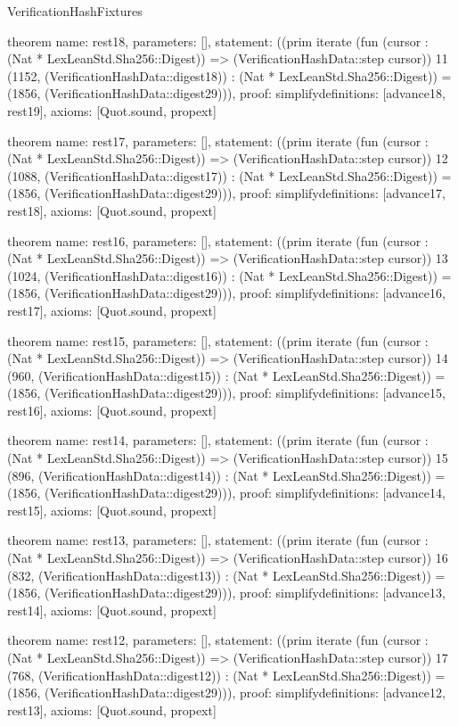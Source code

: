 \begin{lexlean}{VerificationHashFixtures}
\begin{semanticmodule}
theorem{
  name: rest18,
  parameters: [],
  statement: ((prim iterate (fun (cursor : (Nat * LexLeanStd.Sha256::Digest)) => (VerificationHashData::step cursor)) 11 (1152, (VerificationHashData::digest18)) : (Nat * LexLeanStd.Sha256::Digest)) = (1856, (VerificationHashData::digest29))),
  proof: simplify{definitions: [advance18, rest19]},
  axioms: [Quot.sound, propext]
}

theorem{
  name: rest17,
  parameters: [],
  statement: ((prim iterate (fun (cursor : (Nat * LexLeanStd.Sha256::Digest)) => (VerificationHashData::step cursor)) 12 (1088, (VerificationHashData::digest17)) : (Nat * LexLeanStd.Sha256::Digest)) = (1856, (VerificationHashData::digest29))),
  proof: simplify{definitions: [advance17, rest18]},
  axioms: [Quot.sound, propext]
}

theorem{
  name: rest16,
  parameters: [],
  statement: ((prim iterate (fun (cursor : (Nat * LexLeanStd.Sha256::Digest)) => (VerificationHashData::step cursor)) 13 (1024, (VerificationHashData::digest16)) : (Nat * LexLeanStd.Sha256::Digest)) = (1856, (VerificationHashData::digest29))),
  proof: simplify{definitions: [advance16, rest17]},
  axioms: [Quot.sound, propext]
}

theorem{
  name: rest15,
  parameters: [],
  statement: ((prim iterate (fun (cursor : (Nat * LexLeanStd.Sha256::Digest)) => (VerificationHashData::step cursor)) 14 (960, (VerificationHashData::digest15)) : (Nat * LexLeanStd.Sha256::Digest)) = (1856, (VerificationHashData::digest29))),
  proof: simplify{definitions: [advance15, rest16]},
  axioms: [Quot.sound, propext]
}

theorem{
  name: rest14,
  parameters: [],
  statement: ((prim iterate (fun (cursor : (Nat * LexLeanStd.Sha256::Digest)) => (VerificationHashData::step cursor)) 15 (896, (VerificationHashData::digest14)) : (Nat * LexLeanStd.Sha256::Digest)) = (1856, (VerificationHashData::digest29))),
  proof: simplify{definitions: [advance14, rest15]},
  axioms: [Quot.sound, propext]
}

theorem{
  name: rest13,
  parameters: [],
  statement: ((prim iterate (fun (cursor : (Nat * LexLeanStd.Sha256::Digest)) => (VerificationHashData::step cursor)) 16 (832, (VerificationHashData::digest13)) : (Nat * LexLeanStd.Sha256::Digest)) = (1856, (VerificationHashData::digest29))),
  proof: simplify{definitions: [advance13, rest14]},
  axioms: [Quot.sound, propext]
}

theorem{
  name: rest12,
  parameters: [],
  statement: ((prim iterate (fun (cursor : (Nat * LexLeanStd.Sha256::Digest)) => (VerificationHashData::step cursor)) 17 (768, (VerificationHashData::digest12)) : (Nat * LexLeanStd.Sha256::Digest)) = (1856, (VerificationHashData::digest29))),
  proof: simplify{definitions: [advance12, rest13]},
  axioms: [Quot.sound, propext]
}


\end{semanticmodule}
\end{lexlean}
